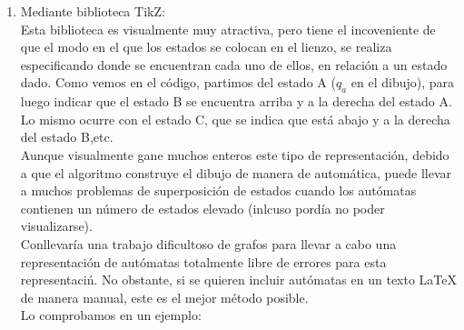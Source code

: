 \documentclass[12pt,a4paper,spanish]{book}
\begin{document}
\begin{itemize}
\begin{enumerate}
\newpage
\item Mediante biblioteca TikZ:\\
\newline
Esta biblioteca es visualmente muy atractiva, pero tiene el incoveniente de que el modo en el que los estados se colocan en el lienzo, se realiza especificando donde se encuentran cada uno de ellos, en relaci\'on a un estado dado.
Como vemos en el c\'odigo, partimos del estado A ($q_{a}$ en el dibujo), para luego indicar que el estado B se encuentra arriba y a la derecha del estado A. Lo mismo ocurre con el estado C, que se indica que est\'a abajo y a la derecha del estado B,etc.\\
\newline
Aunque visualmente gane muchos enteros este tipo de representaci\'on, debido a que el algoritmo construye el dibujo de manera de autom\'atica, puede llevar a muchos problemas de superposici\'on de estados cuando los aut\'omatas contienen un n\'umero de estados elevado (inlcuso pord\'ia no poder visualizarse).\\
Conllevar\'ia una trabajo dificultoso de grafos para llevar a cabo una representaci\'on de aut\'omatas totalmente libre de errores para esta representaci\'n.
No obstante, si se quieren incluir aut\'omatas en un texto \LaTeX{} de manera manual, este es el mejor m\'etodo posible.\\
\newline
Lo comprobamos en un ejemplo:
\begin{center}

\end{center}
\end{enumerate}
\end{itemize}
\end{document}
